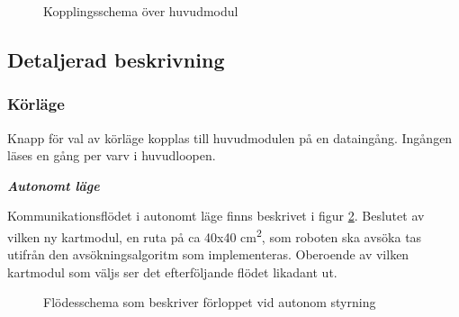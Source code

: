 \documentclass[11pt]{article}
\begin{document}
\begin{flushleft}
\begin{figure}[htbp]
\centering
\noindent{}
	\caption{Kopplingsschema över huvudmodul \label{kopplingsschema:huvudmodul}}	
\end{figure}

\subsection{Detaljerad beskrivning}

\subsubsection {Körläge}
Knapp för val av körläge kopplas till huvudmodulen på en dataingång. Ingången läses en gång per varv i huvudloopen.

\textbf{\textit{Autonomt läge}}

Kommunikationsflödet i autonomt läge finns beskrivet i figur \ref{autonomousMode}. Beslutet av vilken ny kartmodul, en ruta på ca 40x40 cm\textsuperscript{2}, som roboten ska avsöka tas utifrån den avsökningsalgoritm som implementeras. Oberoende av vilken kartmodul som väljs ser det efterföljande flödet likadant ut.

\begin{figure}[htbp]
\centering
\noindent\resizebox{0.9\linewidth}{!}{
	}
	\cprotect\caption{Flödesschema som beskriver förloppet vid autonom styrning \label{autonomousMode}}	
\end{figure}


\end{flushleft}
\end{document}
